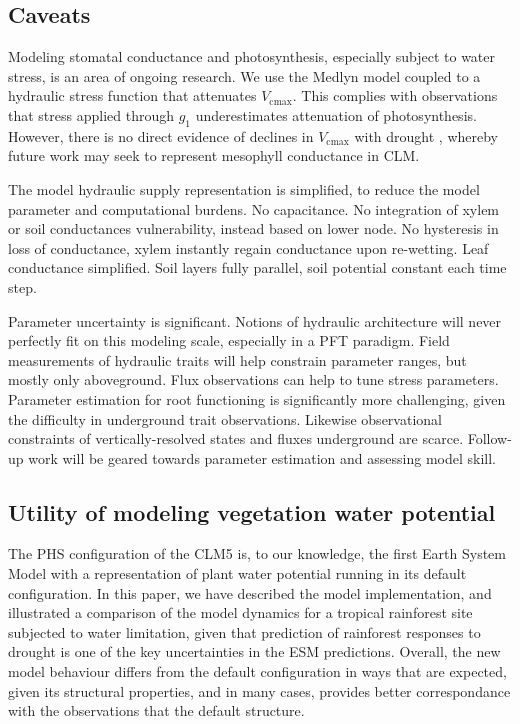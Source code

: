 \documentclass[draft,linenumbers]{agujournal}
\begin{document}
\subsection{Caveats}

    Modeling stomatal conductance and photosynthesis, especially subject to water stress, is an area of ongoing research. We use the Medlyn model coupled to a hydraulic stress function that attenuates $V_{\text{cmax}}$. This complies with observations \citep{lin2018,zhou2013} that stress applied through $g_1$ underestimates attenuation of photosynthesis. However, there is no direct evidence of declines in $V_{\text{cmax}}$ with drought \citep{flexas2006}, whereby future work may seek to represent mesophyll conductance in CLM.
    
    The model hydraulic supply representation is simplified, to reduce the model parameter and computational burdens.
    No capacitance.
    No integration of xylem or soil conductances vulnerability, instead based on lower node.
    No hysteresis in loss of conductance, xylem instantly regain conductance upon re-wetting.
    Leaf conductance simplified.
    Soil layers fully parallel, soil potential constant each time step.
    
    Parameter uncertainty is significant.
    Notions of hydraulic architecture will never perfectly fit on this modeling scale, especially in a PFT paradigm.
    Field measurements of hydraulic traits will help constrain parameter ranges, but mostly only aboveground.
    Flux observations can help to tune stress parameters.
    Parameter estimation for root functioning is significantly more challenging, given the difficulty in underground trait observations.
    Likewise observational constraints of vertically-resolved states and fluxes underground are scarce.
    Follow-up work will be geared towards parameter estimation and assessing model skill.

\subsection{Utility of modeling vegetation water potential}


    The PHS configuration of the CLM5 is, to our knowledge, the first Earth System Model with a representation of plant water potential running in its default configuration. In this paper, we have described the model implementation, and illustrated a comparison of the model dynamics for a tropical rainforest site subjected to water limitation, given that prediction of rainforest responses to drought is one of the key uncertainties in the ESM predictions. Overall, the new model behaviour differs from the default configuration in ways that are expected, given its structural properties, and in many cases, provides better correspondance with the observations that the default structure. 
    
\end{document}
